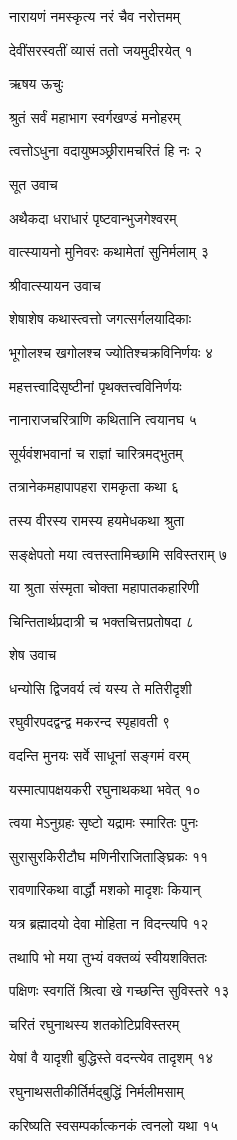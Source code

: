 नारायणं नमस्कृत्य नरं चैव नरोत्तमम्

देवींसरस्वतीं व्यासं ततो जयमुदीरयेत् १

ऋषय ऊचुः

श्रुतं सर्वं महाभाग स्वर्गखण्डं मनोहरम्

त्वत्तोऽधुना वदायुष्मञ्छ्रीरामचरितं हि नः २

सूत उवाच

अथैकदा धराधारं पृष्टवान्भुजगेश्वरम्

वात्स्यायनो मुनिवरः कथामेतां सुनिर्मलाम् ३

श्रीवात्स्यायन उवाच

शेषाशेष कथास्त्वत्तो जगत्सर्गलयादिकाः

भूगोलश्च खगोलश्च ज्योतिश्चक्रविनिर्णयः ४

महत्तत्त्वादिसृष्टीनां पृथक्तत्त्वविनिर्णयः

नानाराजचरित्राणि कथितानि त्वयानघ ५

सूर्यवंशभवानां च राज्ञां चारित्रमद्भुतम्

तत्रानेकमहापापहरा रामकृता कथा ६

तस्य वीरस्य रामस्य हयमेधकथा श्रुता

सङ्क्षेपतो मया त्वत्तस्तामिच्छामि सविस्तराम् ७

या श्रुता संस्मृता चोक्ता महापातकहारिणी

चिन्तितार्थप्रदात्री च भक्तचित्तप्रतोषदा ८

शेष उवाच

धन्योसि द्विजवर्य त्वं यस्य ते मतिरीदृशी

रघुवीरपदद्वन्द्व मकरन्द स्पृहावती ९

वदन्ति मुनयः सर्वे साधूनां सङ्गमं वरम्

यस्मात्पापक्षयकरी रघुनाथकथा भवेत् १०

त्वया मेऽनुग्रहः सृष्टो यद्रामः स्मारितः पुनः

सुरासुरकिरीटौघ मणिनीराजिताङ्घ्रिकः ११

रावणारिकथा वार्द्धौ मशको मादृशः कियान्

यत्र ब्रह्मादयो देवा मोहिता न विदन्त्यपि १२

तथापि भो मया तुभ्यं वक्तव्यं स्वीयशक्तितः

पक्षिणः स्वगतिं श्रित्वा खे गच्छन्ति सुविस्तरे १३

चरितं रघुनाथस्य शतकोटिप्रविस्तरम्

येषां वै यादृशी बुद्धिस्ते वदन्त्येव तादृशम् १४

रघुनाथसतीकीर्तिर्मद्बुद्धिं निर्मलीमसाम्

करिष्यति स्वसम्पर्कात्कनकं त्वनलो यथा १५


